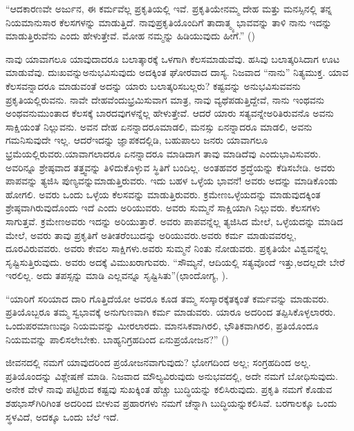 “ಆದಕಾರಣವೇ ಅರ್ಜುನ, ಈ ಕರ್ಮವೆಲ್ಲ ಪ್ರಕೃತಿಯಲ್ಲಿ ಇವೆ. ಪ್ರಕೃತಿಯೇ\break ನಮ್ಮ ದೇಹ ಮತ್ತು ಮನಸ್ಸಿನಲ್ಲಿ ತನ್ನ ನಿಯಮಾನುಸಾರ ಕೆಲಸಗಳನ್ನು ಮಾಡುತ್ತಿದೆ. ನಾವು\break ಪ್ರಕೃತಿಯೊಂದಿಗೆ ತಾದಾತ್ಮ್ಯ ಭಾವವನ್ನು ತಾಳಿ ನಾನು ಇದನ್ನು ಮಾಡುತ್ತಿರುವೆನು ಎಂದು ಹೇಳುತ್ತೇವೆ. ಮೋಹ ನಮ್ಮನ್ನು ಹಿಡಿಯುವುದು ಹೀಗೆ.” ()

ನಾವು ಯಾವಾಗಲೂ ಯಾವುದಾದರೂ ಬಲಾತ್ಕಾರಕ್ಕೆ ಒಳಗಾಗಿ ಕೆಲಸ\break ಮಾಡುವೆವು. ಹಸಿವು ಬಲಾತ್ಕರಿಸಿದಾಗ ಊಟ ಮಾಡುವೆವು. ದುಃಖವನ್ನು\break ಅನುಭವಿಸುವುದು ಅದಕ್ಕಿಂತ ಘೋರವಾದ ದಾಸ್ಯ. ನಿಜವಾದ “ನಾನು” ನಿತ್ಯ\break ಮುಕ್ತ. ಯಾವ ಕೆಲಸವನ್ನಾದರೂ ಮಾಡುವಂತೆ ಅದನ್ನು ಯಾರು ಬಲಾತ್ಕರಿಸ\break ಬಲ್ಲರು? ಕಷ್ಟವನ್ನು ಅನುಭವಿಸುವವನು ಪ್ರಕೃತಿಯಲ್ಲಿರುವನು. ನಾವೇ ದೇಹವೆಂದು\break ಭ್ರಮಿಸುವಾಗ ಮಾತ್ರ, ನಾವು ವ್ಯಥೆಪಡುತ್ತಿದ್ದೇವೆ, ನಾನು ಇಂಥವನು ಅಂಥವನು\break ಮುಂತಾದ ಕೆಲಸಕ್ಕೆ ಬಾರದವುಗಳನ್ನೆಲ್ಲ ಹೇಳುತ್ತೇವೆ. ಆದರೆ ಯಾರು ಸತ್ಯವನ್ನೇ\break ಅರಿತಿರುವನೊ ಅವನು ಸಾಕ್ಷಿಯಂತೆ ನಿಲ್ಲುವನು. ಅವನ ದೇಹ ಏನನ್ನಾದರೂ\break ಮಾಡಲಿ, ಮನಸ್ಸು ಏನನ್ನಾದರೂ ಮಾಡಲಿ, ಅವನು ಗಮನಿಸುವುದೇ ಇಲ್ಲ. ಆದರೆ\break ಇದನ್ನು ಜ್ಞಾಪಕದಲ್ಲಿಡಿ, ಬಹುಪಾಲು ಜನರು ಯಾವಾಗಲೂ ಭ್ರಮೆಯಲ್ಲಿರುವರು.\break ಯಾವಾಗಲಾದರೂ ಏನನ್ನಾದರೂ ಮಾಡಿದಾಗ ತಾವು ಮಾಡಿದೆವು ಎಂದು\break ಭಾವಿಸುವರು. ಅವರಿನ್ನೂ ಶ್ರೇಷ್ಠವಾದ ತತ್ತ್ವವನ್ನು ತಿಳಿದುಕೊಳ್ಳುವ ಸ್ಥಿತಿಗೆ ಬಂದಿಲ್ಲ. ಅಂತಹವರ ಶ್ರದ್ಧೆಯನ್ನು ಕೆಡಿಸಬೇಡಿ. ಅವರು ಪಾಪವನ್ನು ತ್ಯಜಿಸಿ ಪುಣ್ಯವನ್ನು\break ಮಾಡುತ್ತಿರುವರು. ಇದು ಬಹಳ ಒಳ್ಳೆಯ ಭಾವನೆ! ಅವರು ಅದನ್ನು ಮಾಡಿಕೊಂಡು ಹೋಗಲಿ. ಅವರು ಒಂದು ಒಳ್ಳೆಯ ಕೆಲಸವನ್ನು ಮಾಡುತ್ತಿರುವರು. ಕ್ರಮೇಣ\break ಒಳ್ಳೆಯದನ್ನು ಮಾಡುವುದಕ್ಕಿಂತ ಶ್ರೇಷ್ಠವಾಗಿರುವುದೊಂದು ಇದೆ ಎಂದು ಅರಿಯು\-ವರು. ಅವರು ಸುಮ್ಮನೆ ಸಾಕ್ಷಿಯಾಗಿ ನಿಲ್ಲುವರು. ಕೆಲಸಗಳು ಸಾಗುತ್ತವೆ. ಕ್ರಮೇಣ\break ಅವರು ಇದನ್ನು ಅರಿಯುತ್ತಾರೆ. ಅವರು ಪಾಪವನ್ನೆಲ್ಲ ತ್ಯಜಿಸಿದ ಮೇಲೆ, ಒಳ್ಳೆಯದನ್ನು ಮಾಡಿದ ಮೇಲೆ, ಅವರು ತಾವು ಪ್ರಕೃತಿಗೆ ಅತೀತರೆಂಬುದನ್ನು ಅರಿಯುವರು.\break ಅವರು ಕರ್ಮ ಮಾಡುವವರಲ್ಲ, ದೂರವಿರುವವರು. ಅವರು ಕೇವಲ ಸಾಕ್ಷಿಗಳು.\break ಅವರು ಸುಮ್ಮನೆ ನಿಂತು ನೋಡುವರು. ಪ್ರಕೃತಿಯೇ ವಿಶ್ವವನ್ನೆಲ್ಲ ಸೃಷ್ಟಿಸುತ್ತಿರುವುದು. ಅವರು ಅದಕ್ಕೆ ವಿಮುಖರಾಗುವರು. “ಸೌಮ್ಯನೆ, ಆದಿಯಲ್ಲಿ ಸತ್ಯವೊಂದೆ ಇತ್ತು,\break ಅದಲ್ಲದೇ ಬೇರೆ ಇರಲಿಲ್ಲ. ಅದು ತಪಸ್ಸನ್ನು ಮಾಡಿ ಎಲ್ಲವನ್ನೂ ಸೃಷ್ಟಿಸಿತು”\break (ಛಾಂದೋಗ್ಯ, ).

“ಯಾರಿಗೆ ಸರಿಯಾದ ದಾರಿ ಗೊತ್ತಿದೆಯೋ ಅವರೂ ಕೂಡ ತಮ್ಮ ಸಂಸ್ಕಾರಕ್ಕೆ\break ತಕ್ಕಂತೆ ಕರ್ಮವನ್ನು ಮಾಡುವರು. ಪ್ರತಿಯೊಬ್ಬರೂ ತಮ್ಮ ಸ್ವಭಾವಕ್ಕೆ ಅನುಗುಣ\break ವಾಗಿ ಕರ್ಮ ಮಾಡುವರು. ಯಾರೂ ಅದರಿಂದ ತಪ್ಪಿಸಿಕೊಳ್ಳಲಾರರು. ಒಂದು\break ಪರಮಾಣುವೂ ನಿಯಮವನ್ನು ಮೀರಲಾರದು. ಮಾನಸಿಕವಾಗಿರಲಿ, ಭೌತಿಕವಾಗಿರಲಿ, ಪ್ರತಿಯೊಂದೂ ನಿಯಮವನ್ನು ಪಾಲಿಸಲೇಬೇಕು. ಬಾಹ್ಯನಿಗ್ರಹದಿಂದ ಏನು\break ಪ್ರಯೋಜನ?” ()

ಜೀವನದಲ್ಲಿ ನಮಗೆ ಯಾವುದರಿಂದ ಪ್ರಯೋಜನವಾಗುವುದು? ಭೋಗದಿಂದ ಅಲ್ಲ; ಸಂಗ್ರಹದಿಂದ ಅಲ್ಲ. ಪ್ರತಿಯೊಂದನ್ನು ವಿಶ್ಲೇಷಣೆ ಮಾಡಿ. ನಿಜವಾದ ಮೌಲ್ಯವಿರುವುದು ಅನುಭವದಲ್ಲಿ, ಅದೇ ನಮಗೆ ಬೋಧಿಸುವುದು. ಅನೇಕ ವೇಳೆ ನಾವು ಪಟ್ಟಿರುವ ಕಷ್ಟವು ಸುಖಕ್ಕಿಂತ ಹೆಚ್ಚು ಬುದ್ಧಿಯನ್ನು ಕಲಿಸಿರುವುದು. ಪ್ರಕೃತಿ ನಮಗೆ ಕೊಡುವ ಶಹಭಾಸ್​ಗಿರಿಗಿಂತ ಅದರಿಂದ ಬೀಳುವ ಪ್ರಹಾರಗಳು ನಮಗೆ ಚೆನ್ನಾಗಿ ಬುದ್ಧಿಯನ್ನು\break ಕಲಿಸಿವೆ. ಬರಗಾಲಕ್ಕೂ ಒಂದು ಸ್ಥಳವಿದೆ, ಅದಕ್ಕೂ ಒಂದು ಬೆಲೆ ಇದೆ.

